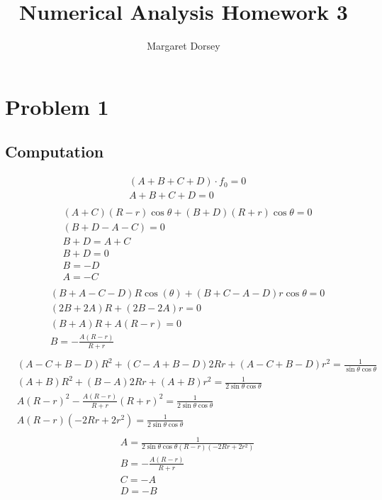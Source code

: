 \documentclass[11pt,fleqn]{article} %
\title{Numerical Analysis Homework 3}
\author{Margaret Dorsey}
\begin{document}
\maketitle

\section*{Problem 1}
\subsection*{Computation}
\begin{align*}
&(A+B+C+D)\cdot f_{0} = 0 \\
&A+B+C+D  = 0 \\
\end{align*}
\begin{align*}
&(A+C)(R-r)\cos\theta + (B+D)(R+r)\cos\theta = 0 \\
&(B+D-A-C) = 0 \\
&B+D = A+C \\
&B+D = 0 \\
&B = -D \\
&A = -C\\
\end{align*}
\begin{align*}
&(B+A-C-D)R\cos(\theta) + (B+C-A-D)r\cos\theta = 0\\
&(2B + 2A)R+(2B-2A)r = 0\\
&(B+A)R + A(R-r) = 0\\
&B = -\frac{A(R-r)}{R+r}\\
\end{align*}
\begin{align*}
&(A-C+B-D)R^2 + (C-A+B-D)2Rr + (A-C+B-D)r^2 = \frac{1}{\sin\theta\cos\theta}\\
&(A+B)R^2 + (B-A)2Rr + (A+B)r^2 = \frac{1}{2\sin\theta\cos\theta}\\
&A(R-r)^2 - \frac{A(R-r)}{R+r}(R+r)^2 = \frac{1}{2\sin\theta\cos\theta}\\
&A(R-r)(-2Rr + 2r^2) = \frac{1}{2\sin\theta\cos\theta}\\
\end{align*}
\begin{align*}
&A=  \frac{1}{2\sin\theta\cos\theta(R-r)(-2Rr + 2r^2) }\\
&B = -\frac{A(R-r)}{R+r}\\
&C = -A\\
&D = -B\\
\end{align*}
\end{document}
